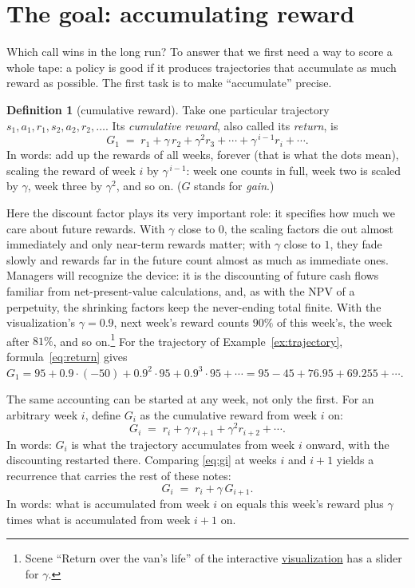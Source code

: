 \documentclass[11pt,a4paper]{article}
\theoremstyle{definition}
\newtheorem{definition}{Definition}[section]
\theoremstyle{remark}
\numberwithin{equation}{section}
\newcommand{\vizhref}[1]{\href{https://eth-ainit-fs26.github.io/rl-arcade/repair-or-replace/}{#1}}
\begin{document}
\section{The goal: accumulating reward}

Which call wins in the long run? To answer that we first need a way to score a whole tape: a
policy is good if it produces trajectories that accumulate as much reward as possible. The
first task is to make ``accumulate'' precise.

\begin{definition}[cumulative reward]
Take one particular trajectory $s_1, a_1, r_1, s_2, a_2, r_2, \dots$. Its \emph{cumulative
reward}, also called its \emph{return}, is
\begin{equation}\label{eq:return}
G_1 \;=\; r_1 + \gamma\, r_2 + \gamma^2 r_3 + \cdots + \gamma^{\,i-1} r_i + \cdots.
\end{equation}
In words: add up the rewards of all weeks, forever (that is what the dots mean), scaling the
reward of week $i$ by $\gamma^{\,i-1}$: week one counts in full, week two is scaled by
$\gamma$, week three by $\gamma^2$, and so on. ($G$ stands for \emph{gain}.)
\end{definition}

Here the discount factor plays its very important role: it specifies how much we care about
future rewards. With $\gamma$ close to $0$, the scaling factors die out almost immediately
and only near-term rewards matter; with $\gamma$ close to $1$, they fade slowly and rewards
far in the future count almost as much as immediate ones. Managers will recognize the device:
it is the discounting of future cash flows familiar from net-present-value calculations, and,
as with the NPV of a perpetuity, the shrinking factors keep the never-ending total finite.
With the visualization's $\gamma = 0.9$, next week's reward counts $90\%$ of this week's, the
week after $81\%$, and so on.\footnote{Scene ``Return over the van's life'' of the
interactive \vizhref{visualization} has a slider for $\gamma$.} For the trajectory of
Example~\ref{ex:trajectory}, formula~\eqref{eq:return} gives
$G_1 = 95 + 0.9 \cdot (-50) + 0.9^2 \cdot 95 + 0.9^3 \cdot 95 + \cdots
= 95 - 45 + 76.95 + 69.255 + \cdots$.

The same accounting can be started at any week, not only the first. For an arbitrary week
$i$, define $G_i$ as the cumulative reward from week $i$ on:
\begin{equation}\label{eq:gi}
G_i \;=\; r_i + \gamma\, r_{i+1} + \gamma^2 r_{i+2} + \cdots.
\end{equation}
In words: $G_i$ is what the trajectory accumulates from week $i$ onward, with the discounting
restarted there. Comparing \eqref{eq:gi} at weeks $i$ and $i+1$ yields a recurrence that
carries the rest of these notes:
\begin{equation}\label{eq:recurrence}
G_i \;=\; r_i + \gamma\, G_{i+1}.
\end{equation}
In words: what is accumulated from week $i$ on equals this week's reward plus $\gamma$ times
what is accumulated from week $i+1$ on.
\end{document}

